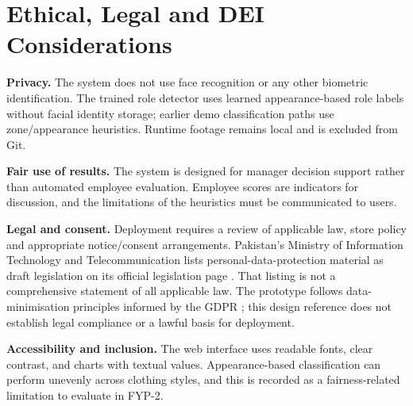 \section{Ethical, Legal and DEI Considerations}
\textbf{Privacy.} The system does not use face recognition or any other biometric identification. The trained role detector uses learned appearance-based role labels without facial identity storage; earlier demo classification paths use zone/appearance heuristics. Runtime footage remains local and is excluded from Git.

\textbf{Fair use of results.} The system is designed for manager decision support rather than automated employee evaluation. Employee scores are indicators for discussion, and the limitations of the heuristics must be communicated to users.

\textbf{Legal and consent.} Deployment requires a review of applicable law, store policy and appropriate notice/consent arrangements. Pakistan's Ministry of Information Technology and Telecommunication lists personal-data-protection material as draft legislation on its official legislation page \cite{pakistanMoittLegislation}. That listing is not a comprehensive statement of all applicable law. The prototype follows data-minimisation principles informed by the GDPR \cite{gdpr2016}; this design reference does not establish legal compliance or a lawful basis for deployment.

\textbf{Accessibility and inclusion.} The web interface uses readable fonts, clear contrast, and charts with textual values. Appearance-based classification can perform unevenly across clothing styles, and this is recorded as a fairness-related limitation to evaluate in FYP-2.
